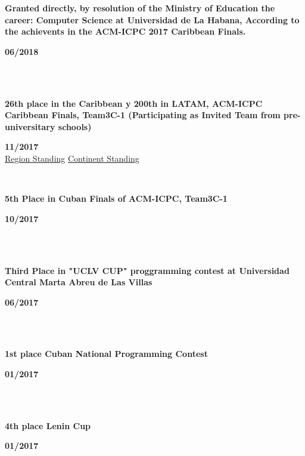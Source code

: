 \documentclass{article}
\begin{document}
\begin{minipage}{0.8\textwidth}
    \parbox{0.8\linewidth}{\textbf{Granted directly, by resolution of the Ministry of Education the career: Computer Science at Universidad de La Habana, According to the achievents in  the ACM-ICPC 2017 Caribbean Finals.}} \hfill \textbf{06/2018}\\
    \\
\end{minipage} \\
\begin{minipage}{0.8\textwidth}
    \parbox{0.8\linewidth}{\textbf{26th place in the Caribbean y 200th in LATAM, ACM-ICPC Caribbean Finals, Team3C-1 (Participating as  Invited Team from pre-universitary schools)}} \hfill \textbf{11/2017}\\
    \href{https://matcomgrader.com/media/posts/5167/ranking/caribbean.png}{Region Standing}
    \href{https://matcomgrader.com/media/posts/5167/ranking/general.png}{Continent Standing}
    \\
\end{minipage} \hfill {}\\
\begin{minipage}{0.8\textwidth}
    \parbox{0.8\linewidth}{\textbf{5th Place in Cuban Finals of ACM-ICPC, Team3C-1}} \hfill \textbf{10/2017}\\
    \\
\end{minipage}\\
\begin{minipage}{0.8\textwidth}
    \parbox{0.8\linewidth}{\textbf{Third Place in "UCLV CUP" proggramming contest at Universidad Central Marta Abreu de Las Villas}} \hfill \textbf{06/2017}\\
    \\
\end{minipage}\\
\begin{minipage}{0.8\textwidth}
    \parbox{0.8\linewidth}{\textbf{1st place Cuban National Programming Contest}} \hfill \textbf{01/2017}\\
    \\
\end{minipage}\\
\begin{minipage}{0.8\textwidth}
    \parbox{0.8\linewidth}{\textbf{4th place Lenin Cup}} \hfill \textbf{01/2017}\\
    \\
\end{minipage}\\
\end{document}

